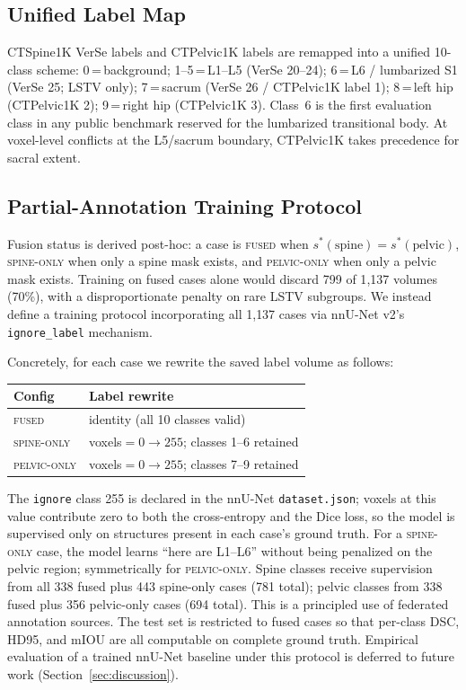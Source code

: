 \documentclass[pmlr]{jmlr}
\begin{document}
\subsection{Unified Label Map}
\label{sec:labels}

CTSpine1K VerSe labels and CTPelvic1K labels are remapped into a
unified 10-class scheme: 0\,=\,background; 1--5\,=\,L1--L5
(VerSe 20--24); 6\,=\,L6 / lumbarized S1 (VerSe 25; LSTV only);
7\,=\,sacrum (VerSe 26 / CTPelvic1K label 1); 8\,=\,left hip
(CTPelvic1K 2); 9\,=\,right hip (CTPelvic1K 3).
Class~6 is the first evaluation class in any public benchmark
reserved for the lumbarized transitional body.
At voxel-level conflicts at the L5/sacrum boundary, CTPelvic1K
takes precedence for sacral extent.

\subsection{Partial-Annotation Training Protocol}
\label{sec:ignore_label}

Fusion status is derived post-hoc: a case is \textsc{fused} when
$s^*(\text{spine}) = s^*(\text{pelvic})$, \textsc{spine-only} when
only a spine mask exists, and \textsc{pelvic-only} when only a
pelvic mask exists.
Training on fused cases alone would discard 799 of 1{,}137 volumes
(70\%), with a disproportionate penalty on rare LSTV subgroups.
We instead define a training protocol incorporating all 1{,}137
cases via nnU-Net v2's \texttt{ignore\_label} mechanism.

Concretely, for each case we rewrite the saved label volume as
follows:

\begin{center}
\begin{tabular}{@{}ll@{}}
\toprule
\textbf{Config} & \textbf{Label rewrite} \\
\midrule
\textsc{fused}        & identity (all 10 classes valid) \\
\textsc{spine-only}   & voxels$=0 \rightarrow 255$;
                        classes 1--6 retained \\
\textsc{pelvic-only}  & voxels$=0 \rightarrow 255$;
                        classes 7--9 retained \\
\bottomrule
\end{tabular}
\end{center}

The \texttt{ignore} class 255 is declared in the nnU-Net
\texttt{dataset.json}; voxels at this value contribute zero to both
the cross-entropy and the Dice loss, so the model is supervised
only on structures present in each case's ground truth.
For a \textsc{spine-only} case, the model learns ``here are L1--L6''
without being penalized on the pelvic region; symmetrically for
\textsc{pelvic-only}.
Spine classes receive supervision from all 338 fused plus 443
spine-only cases (781 total); pelvic classes from 338 fused plus
356 pelvic-only cases (694 total).
This is a principled use of federated annotation sources.
The test set is restricted to fused cases so that per-class DSC,
HD95, and mIOU are all computable on complete ground truth.
Empirical evaluation of a trained nnU-Net baseline under this
protocol is deferred to future work
(Section~\ref{sec:discussion}).
\end{document}
